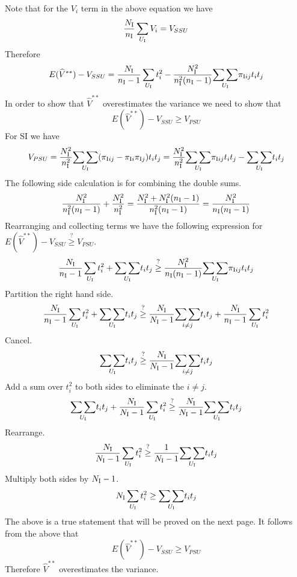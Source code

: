 \documentclass[12pt]{article}
\begin{document}

Note that for the $V_i$ term in the above equation we have
\[
{N_{\rm I}\over n_{\rm I}}\sum_{U_{\rm I}}V_i=V_{SSU}
\]
Therefore
\[
E(\widehat V^{**})-V_{SSU}=
{N_{\rm I}\over n_{\rm I}-1}\sum_{U_{\rm I}}t_i^2
-{N_{\rm I}^2\over n_{\rm I}^2(n_{\rm I}-1)}
\underset{U_{\rm I}}{\sum\sum}\pi_{\mathrm Iij}t_it_j
\]
In order to show that $\widehat V^{**}$ overestimates the variance we need to show
that
\[
E(\widehat V^{**})-V_{SSU}
\ge V_{PSU}
\]
For SI we have
\[
V_{PSU}={N_{\rm I}^2\over n_{\rm I}^2}\underset{U_{\rm I}}{\sum\sum}
(\pi_{\mathrm Iij}-\pi_{\mathrm Ii}\pi_{\mathrm Ij})t_it_j
=
{N_{\rm I}^2\over n_{\rm I}^2}\underset{U_{\rm I}}{\sum\sum}\pi_{\mathrm Iij}t_it_j
-\underset{U_{\rm I}}{\sum\sum}t_it_j
\]
The following side calculation is for combining the double sums.
\[
{N_{\rm I}^2\over n_{\rm I}^2(n_{\rm I}-1)}
+{N_{\rm I}^2\over n_{\rm I}^2}
=
{N_{\rm I}^2+N_{\rm I}^2(n_{\rm I}-1)\over n_{\rm I}^2(n_{\rm I}-1)}
={N_{\rm I}^2\over n_{\rm I}(n_{\rm I}-1)}
\]
Rearranging and collecting
terms we have the following expression for
$E(\widehat V^{**})-V_{SSU}\stackrel{?}{\ge}V_{PSU}$.
\[
{N_{\rm I}\over n_{\rm I}-1}\sum_{U_{\rm I}}t_i^2
+\underset{U_{\rm I}}{\sum\sum}t_it_j
\stackrel{?}{\ge}
{N_{\rm I}^2\over n_{\rm I}(n_{\rm I}-1)}
\underset{U_{\rm I}}{\sum\sum}\pi_{\mathrm Iij}t_it_j
\]
Partition the right hand side.
\[
{N_{\rm I}\over n_{\rm I}-1}\sum_{U_{\rm I}}t_i^2
+\underset{U_{\rm I}}{\sum\sum}t_it_j
\stackrel{?}{\ge}
{N_{\rm I}\over N_{\rm I}-1}
\underset{i\ne j}{\sum\sum}t_it_j
+
{N_{\rm I}\over n_{\rm I}-1}\sum_{U_{\rm I}}t_i^2
\]
Cancel.
\[
\underset{U_{\rm I}}{\sum\sum}t_it_j
\stackrel{?}{\ge}
{N_{\rm I}\over N_{\rm I}-1}
\underset{i\ne j}{\sum\sum}t_it_j
\]
Add a sum over $t_i^2$ to both sides to eliminate the $i\ne j$.
\[
\underset{U_{\rm I}}{\sum\sum}t_it_j
+{N_{\rm I}\over N_{\rm I}-1}\sum_{U_{\rm I}}t_i^2
\stackrel{?}{\ge}
{N_{\rm I}\over N_{\rm I}-1}
\underset{U_{\rm I}}{\sum\sum}t_it_j
\]
Rearrange.
\[
{N_{\rm I}\over N_{\rm I}-1}\sum_{U_{\rm I}}t_i^2
\stackrel{?}{\ge}
{1\over N_{\rm I}-1}
\underset{U_{\rm I}}{\sum\sum}t_it_j
\]
Multiply both sides by $N_{\rm I}-1$.
\[
N_{\rm I}\sum_{U_{\rm I}}t_i^2
\ge
\underset{U_{\rm I}}{\sum\sum}t_it_j
\]
The above is a true statement that will be proved on the next page.
It follows from the above that
\[
E(\widehat V^{**})-V_{SSU}\ge V_{PSU}
\]
Therefore $\widehat V^{**}$ overestimates the variance.
\end{document}
